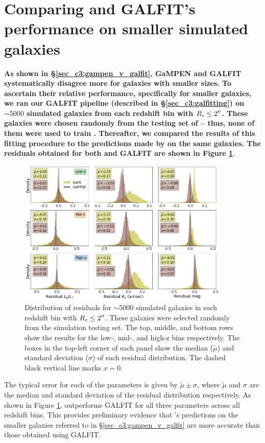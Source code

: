 \section{Comparing \gampen{} and GALFIT's performance on smaller simulated galaxies} \label{ap:sec_c3:gapemn_v_galfit}

\textbf{As shown in \S \ref{sec_c3:gampen_v_galfit}, GaMPEN and GALFIT systematically disagree more for galaxies with smaller sizes. To ascertain their relative performance, specifically for smaller galaxies, we ran our GALFIT pipeline (described in \S \ref{sec_c3:galfitting}) on $\sim5000$ simulated galaxies from each redshift bin with $R_e \leq 2\mbox{$^{\prime\prime}$}$. These galaxies were chosen randomly from the testing set of \gampen{} -- thus, none of them were used to train \gampen{}. Thereafter, we compared the results of this fitting procedure to the predictions made by \gampen{} on the same galaxies. The residuals obtained for both \gampen{} and GALFIT are shown in Figure \ref{fig_c3:gampen_v_galfit}}.

\begin{figure}[htb]
    \centering
    \includegraphics[width = 0.9\textwidth]{gampen_v_galfit.png}
    \caption{Distribution of residuals for $\sim5000$ simulated galaxies in each redshift bin with $R_e \leq 2\mbox{$^{\prime\prime}$}$.  These galaxies were selected randomly from the simulation testing set. The top, middle, and bottom rows show the results for the low-, mid-, and high-z bins respectively. The boxes in the top-left corner of each panel show the median ($\tilde{\mu}$) and standard deviation ($\sigma$) of each residual distribution. The dashed black vertical line marks $x=0$. }
    \label{fig_c3:gampen_v_galfit}
\end{figure}

The typical error for each of the parameters is given by $\tilde{\mu}\pm\sigma$, where $\tilde{\mu}$ and $\sigma$ are the median and standard deviation of the residual distribution respectively. As shown in Figure \ref{fig_c3:gampen_v_galfit}, \gampen{} outperforms GALFIT for all three parameters across all redshift bins. This provides preliminary evidence that \gampen{}'s predictions on the smaller galaxies referred to in \S \ref{sec_c3:gampen_v_galfit} are more accurate than those obtained using GALFIT.

